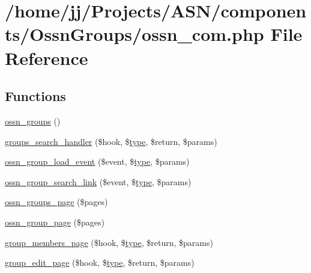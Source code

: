 \hypertarget{_ossn_groups_2ossn__com_8php}{}\section{/home/jj/\+Projects/\+A\+S\+N/components/\+Ossn\+Groups/ossn\+\_\+com.php File Reference}
\label{_ossn_groups_2ossn__com_8php}
\subsection*{Functions}
\begin{DoxyCompactItemize}
\item 
\hyperlink{_ossn_groups_2ossn__com_8php_a6cb4068270c4fa919d0c84a0a04d06d7}{ossn\+\_\+groups} ()
\item 
\hyperlink{_ossn_groups_2ossn__com_8php_ae28351634cb158a39078205b8dd9e44f}{groups\+\_\+search\+\_\+handler} (\$hook, \$\hyperlink{_ossn_wall_2actions_2wall_2post_2group_8php_a2dc1bb4e1ed0029daa81ac0776b14b51}{type}, \$return, \$params)
\item 
\hyperlink{_ossn_groups_2ossn__com_8php_a8e157bcbf3e89e0a552996ebe049a56d}{ossn\+\_\+group\+\_\+load\+\_\+event} (\$event, \$\hyperlink{_ossn_wall_2actions_2wall_2post_2group_8php_a2dc1bb4e1ed0029daa81ac0776b14b51}{type}, \$params)
\item 
\hyperlink{_ossn_groups_2ossn__com_8php_acceeffbff8fab01315cde5c285490b76}{ossn\+\_\+group\+\_\+search\+\_\+link} (\$event, \$\hyperlink{_ossn_wall_2actions_2wall_2post_2group_8php_a2dc1bb4e1ed0029daa81ac0776b14b51}{type}, \$params)
\item 
\hyperlink{_ossn_groups_2ossn__com_8php_a12d212471055acc8f914a4e15554e5b1}{ossn\+\_\+groups\+\_\+page} (\$pages)
\item 
\hyperlink{_ossn_groups_2ossn__com_8php_a634ae8e874a075763b70b281325b5802}{ossn\+\_\+group\+\_\+page} (\$pages)
\item 
\hyperlink{_ossn_groups_2ossn__com_8php_a45d3a874ec91f0818d3396639be63cab}{group\+\_\+members\+\_\+page} (\$hook, \$\hyperlink{_ossn_wall_2actions_2wall_2post_2group_8php_a2dc1bb4e1ed0029daa81ac0776b14b51}{type}, \$return, \$params)
\item 
\hyperlink{_ossn_groups_2ossn__com_8php_a585adc7c1072c3b0aa6c1d0015c2f5dd}{group\+\_\+edit\+\_\+page} (\$hook, \$\hyperlink{_ossn_wall_2actions_2wall_2post_2group_8php_a2dc1bb4e1ed0029daa81ac0776b14b51}{type}, \$return, \$params)

\end{DoxyCompactItemize}
